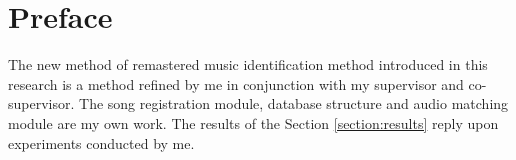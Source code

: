 \chapter*{Preface}

The new method of remastered music identification method introduced
in this research is a method refined by me in conjunction with my supervisor
and co-supervisor. The song registration module, database structure and 
audio matching module are  my own work. The results of the Section \ref{section:results}
reply upon experiments conducted by me. 